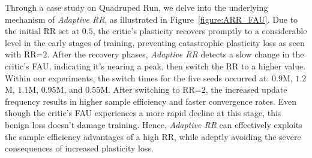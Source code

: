 \vspace{-0.7\baselineskip}
Through a case study on Quadruped Run, we delve into the underlying mechanism of \textcolor{AARed}{\textit{Adaptive RR}}, as illustrated in Figure~\ref{figure:ARR_FAU}. 
Due to the initial RR set at $0.5$, the critic's plasticity recovers promptly to a considerable level in the early stages of training, preventing catastrophic plasticity loss as seen with RR=$2$.
After the recovery phases, \textcolor{AARed}{\textit{Adaptive RR}} detects a slow change in the critic's FAU, indicating it's nearing a peak, then switch the RR to a higher value.
Within our experiments, the switch times for the five seeds occurred at: $0.9$M, $1.2$M, $1.1$M, $0.95$M, and $0.55$M.
After switching to RR=$2$, the increased update frequency results in higher sample efficiency and faster convergence rates.
Even though the critic's FAU experiences a more rapid decline at this stage, this benign loss doesn't damage training.
Hence, \textcolor{AARed}{\textit{Adaptive RR}} can effectively exploits the sample efficiency advantages of a high RR, while adeptly avoiding the severe consequences of increased plasticity loss.

\begin{table}[ht]
\centering
\vspace{-0.5\baselineskip}
\caption{Comparison of Adaptive RR versus static RR with Reset and ReDo implementations. The average episode returns are averaged over 5 seeds after training for 2M environment steps.}
\vspace{-0.5\baselineskip}
\renewcommand{\arraystretch}{1.15}
\setlength{\tabcolsep}{7pt}
\label{table:redo}
\end{table}

